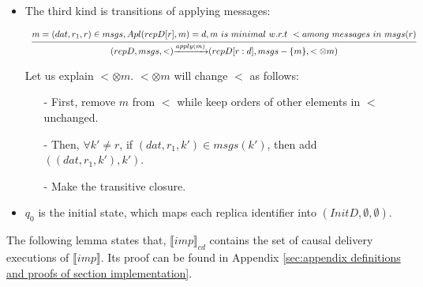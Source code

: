 \begin {itemize}
    Let us explain $< \otimes dat$. $< \otimes dat$ will change $<$ as follows:

    \begin{itemize}
    \setlength{\itemsep}{0.5pt}
    \item[-] $\forall k' \in RId$, in $msgs(k')$, if $m_1 < r$, then erase $(m_1,r)$, add $(m_1,(dat,r,k'))$,

    \item[-] $\forall k' \in RId$, if $m_2$ is the maximal message among $\{ (\_,r,k') \}$ w.r.t $<$, then add $(m_2,(dat,r,k'))$.

    \item[-] Make the transitive closure.
    \end{itemize}

\item[-] The third kind is transitions of applying messages:

    $\begin{array}{l c} \bigfrac{ m = (dat,r_1,r) \in msgs,Apl(repD[r],m) = d, m \ is \ minimal \ w.r.t \ < among \ messages \ in \ msgs(r) } {(repD,msgs,<) {\xrightarrow{apply(m)}} (repD[r:d],msgs - \{ m \}, < \otimes m )} \end{array}$

    Let us explain $< \otimes m$. $< \otimes m$ will change $<$ as follows:

    \begin{itemize}
    \setlength{\itemsep}{0.5pt}
    \item[-] First, remove $m$ from $<$ while keep orders of other elements in $<$ unchanged.

    \item[-] Then, $\forall k' \neq r$, if $(dat,r_1,k') \in msgs(k')$, then add $((dat,r_1,k'),k')$.

    \item[-] Make the transitive closure.
    \end{itemize}

\item[-] $q_0$ is the initial state, which maps each replica identifier into $(InitD,\emptyset,\emptyset)$.
\end{itemize}

The following lemma states that, $\llbracket imp \rrbracket_{cd}$ contains the set of causal delivery executions of $\llbracket imp \rrbracket$. Its proof can be found in Appendix \ref{sec:appendix definitions and proofs of section implementation}.

